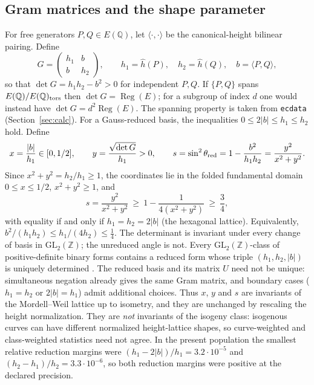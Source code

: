 \documentclass[11pt,a4paper]{article}
\newcommand{\Q}{\mathbb{Q}}
\newcommand{\ZZ}{\mathbb{Z}}
\newcommand{\Reg}{\operatorname{Reg}}
\begin{document}
\subsection{Gram matrices and the shape parameter}
For free generators $P,Q\in E(\Q)$, let $\langle\cdot,\cdot\rangle$ be the canonical-height bilinear pairing. Define
\begin{equation}
G=\begin{pmatrix}h_1&b\\b&h_2\end{pmatrix},\qquad h_1=\hat h(P),\quad h_2=\hat h(Q),\quad b=\langle P,Q\rangle,
\end{equation}
so that $\det G=h_1h_2-b^2>0$ for independent $P,Q$. If $\{P,Q\}$ spans $E(\Q)/E(\Q)_{\rm tors}$ then $\det G=\Reg(E)$; for a subgroup of index $d$ one would instead have $\det G=d^2\Reg(E)$. The spanning property is taken from \texttt{ecdata} (Section~\ref{sec:calc}). For a Gauss-reduced basis, the inequalities $0\le2|b|\le h_1\le h_2$ hold. Define
\begin{equation}
 x=\frac{|b|}{h_1}\in[0,1/2],\qquad y=\frac{\sqrt{\det G}}{h_1}>0,\qquad
 s=\sin^2\theta_{\rm red}=1-\frac{b^2}{h_1h_2}=\frac{y^2}{x^2+y^2}.
 \label{eq:shape}
\end{equation}
Since $x^2+y^2=h_2/h_1\ge1$, the coordinates lie in the folded fundamental domain $0\le x\le1/2$, $x^2+y^2\ge1$, and
\begin{equation}
 s=\frac{y^2}{x^2+y^2}\ \ge\ 1-\frac{1}{4(x^2+y^2)}\ \ge\ \frac34,
 \label{eq:bound}
\end{equation}
with equality if and only if $h_1=h_2=2|b|$ (the hexagonal lattice). Equivalently, $b^2/(h_1h_2)\le h_1/(4h_2)\le\frac14$. The determinant is invariant under every change of basis in $\mathrm{GL}_2(\ZZ)$; the unreduced angle is not. Every $\mathrm{GL}_2(\ZZ)$-class of positive-definite binary forms contains a reduced form whose triple $(h_1,h_2,|b|)$ is uniquely determined \cite{Cohen1993}. The reduced basis and its matrix $U$ need not be unique: simultaneous negation already gives the same Gram matrix, and boundary cases ($h_1=h_2$ or $2|b|=h_1$) admit additional choices. Thus $x$, $y$ and $s$ are invariants of the Mordell--Weil lattice up to isometry, and they are unchanged by rescaling the height normalization. They are \emph{not} invariants of the isogeny class: isogenous curves can have different normalized height-lattice shapes, so curve-weighted and class-weighted statistics need not agree. In the present population the smallest relative reduction margins were $(h_1-2|b|)/h_1=3.2\cdot10^{-5}$ and $(h_2-h_1)/h_2=3.3\cdot10^{-6}$, so both reduction margins were positive at the declared precision.
\end{document}
